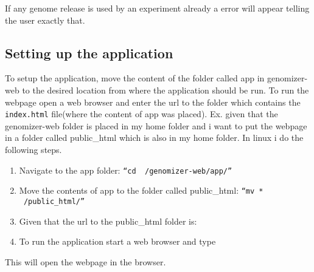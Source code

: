 If any genome release is used by an experiment already a error will appear telling the user exactly that. 

\subsection{Setting up the application}
To setup the application, move the content of the folder called app in genomizer-web to the desired location from where the application should be run. To run the webpage open a web browser and enter the url to the folder which contains the \texttt{index.html} file(where the content of app was placed).
Ex. given that the genomizer-web folder is placed in my home folder and i want to put the webpage in a folder called public\_html which is also in my home folder. In linux i do the following steps.
\begin{enumerate}
	\item Navigate to the app folder: \texttt{“cd ~/genomizer-web/app/”}
	\item Move the contents of app to the folder called public\_html: \texttt{“mv * ~/public\_html/”}
	\item Given that the url to the public\_html folder is: 
	\item To run the application start a web browser and type 
\end{enumerate}
This will open the webpage in the browser.

